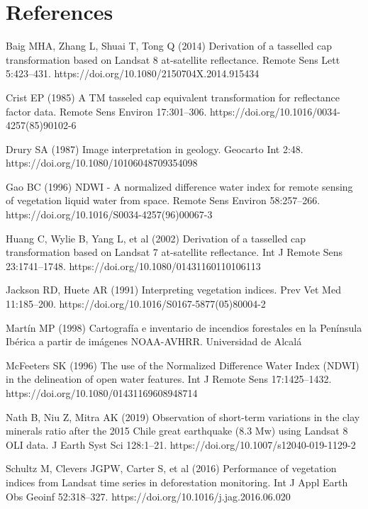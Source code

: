 \documentclass[
  letterpaper,
  DIV=11,
  numbers=noendperiod]{scrreprt}
\begin{document}
\hypertarget{references-2}{%
\section*{References}\label{references-2}}


Baig MHA, Zhang L, Shuai T, Tong Q (2014) Derivation of a tasselled cap
transformation based on Landsat 8 at-satellite reflectance. Remote Sens
Lett 5:423--431. https://doi.org/10.1080/2150704X.2014.915434

Crist EP (1985) A TM tasseled cap equivalent transformation for
reflectance factor data. Remote Sens Environ 17:301--306.
https://doi.org/10.1016/0034-4257(85)90102-6

Drury SA (1987) Image interpretation in geology. Geocarto Int 2:48.
https://doi.org/10.1080/10106048709354098

Gao BC (1996) NDWI - A normalized difference water index for remote
sensing of vegetation liquid water from space. Remote Sens Environ
58:257--266. https://doi.org/10.1016/S0034-4257(96)00067-3

Huang C, Wylie B, Yang L, et al (2002) Derivation of a tasselled cap
transformation based on Landsat 7 at-satellite reflectance. Int J Remote
Sens 23:1741--1748. https://doi.org/10.1080/01431160110106113

Jackson RD, Huete AR (1991) Interpreting vegetation indices. Prev Vet
Med 11:185--200. https://doi.org/10.1016/S0167-5877(05)80004-2

Martín MP (1998) Cartografía e inventario de incendios forestales en la
Península Ibérica a partir de imágenes NOAA-AVHRR. Universidad de Alcalá

McFeeters SK (1996) The use of the Normalized Difference Water Index
(NDWI) in the delineation of open water features. Int J Remote Sens
17:1425--1432. https://doi.org/10.1080/01431169608948714

Nath B, Niu Z, Mitra AK (2019) Observation of short-term variations in
the clay minerals ratio after the 2015 Chile great earthquake (8.3 Mw)
using Landsat 8 OLI data. J Earth Syst Sci 128:1--21.
https://doi.org/10.1007/s12040-019-1129-2

Schultz M, Clevers JGPW, Carter S, et al (2016) Performance of
vegetation indices from Landsat time series in deforestation monitoring.
Int J Appl Earth Obs Geoinf 52:318--327.
https://doi.org/10.1016/j.jag.2016.06.020
\end{document}

